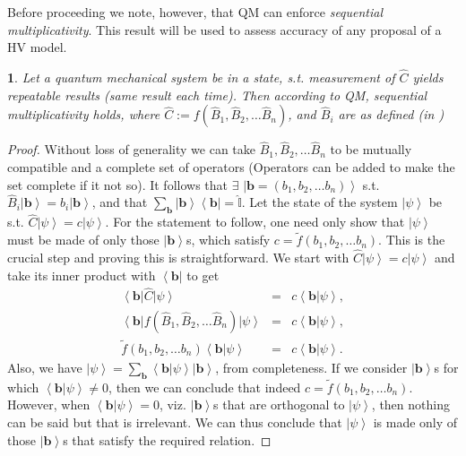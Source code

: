 \documentclass[british,aps,prl,superscriptaddress,nofootinbib,times,reprint]{revtex4-1}
\theoremstyle{plain}
\theoremstyle{definition}
\theoremstyle{remark}
\theoremstyle{remark}
\theoremstyle{remark}
\theoremstyle{plain}
\newtheorem*{prop*}{\protect\propositionname}
\theoremstyle{plain}
\theoremstyle{plain}
\theoremstyle{definition}
\theoremstyle{definition}
\providecommand{\propositionname}{Proposition}
\begin{document}
Before proceeding we note, however, that QM can
enforce \emph{sequential multiplicativity}. This
result will be used to assess accuracy of any
proposal of a HV
model.
\begin{prop*} 
Let a quantum mechanical 
system be in a state, s.t. measurement of
$\hat{C}$ yields repeatable results (same result
each time). Then according to QM, \emph{sequential
multiplicativity} holds, where $\hat{C}:=
f(\hat{B}_{1},\hat{B}_{2},\dots\hat{B}_{n})$, and
$\hat{B}_{i}$ are as defined (in )
\end{prop*}
\begin{proof} 
Without loss of generality we can take
$\hat{B}_{1},\hat{B}_{2},\dots\hat{B}_{n}$ to be
mutually compatible and a complete set of
operators (Operators can be added to make the set
complete if it not so).
It follows
that $\exists$
$\left|\mathbf{b}=\left(b_{1},b_{2},\dots
b_{n}\right)\right\rangle $ s.t.
$\hat{B}_{i}\left|\mathbf{b}\right\rangle
=b_{i}\left|\mathbf{b}\right\rangle $,
and that
$\sum_{\mathbf{b}}\left|\mathbf{b}\right\rangle
\left\langle \mathbf{b}\right|=\hat{\mathbb{I}}$.
Let the state of the system
$\left|\psi\right\rangle $ be s.t.
$\hat{C}\left|\psi\right\rangle
=c\left|\psi\right\rangle $. For
the statement to follow, one need only show that
$\left|\psi\right\rangle $ must be made of only
those $\left|\mathbf{b}\right\rangle $s, which
satisfy $c=\tilde
f(b_{1},b_{2},\dots
b_{n})$.  This is the crucial step and
proving this is straightforward. We start with
$\hat{C}\left|\psi\right\rangle
=c\left|\psi\right\rangle $ and take its inner
product with $\left\langle \mathbf{b}\right|$ to
get \begin{eqnarray*} \left\langle
\mathbf{b}\right|\hat{C}\left|\psi\right\rangle  &
= & c\left\langle \mathbf{b}|\psi\right\rangle ,\\
\left\langle
\mathbf{b}\right|f(\hat{B}_{1},\hat{B}_{2},\dots\hat{B}_{n})
\left|\psi\right\rangle
& = & c\left\langle \mathbf{b}|\psi\right\rangle
,\\ \tilde f(b_{1},b_{2},\dots
b_{n})\left\langle
\mathbf{b}|\psi\right\rangle  & = & c\left\langle
\mathbf{b}|\psi\right\rangle .  \end{eqnarray*}
Also, we have $\left|\psi\right\rangle
=\sum_{\mathbf{b}}\left\langle
\mathbf{b}|\psi\right\rangle
\left|\mathbf{b}\right\rangle $, from
completeness. If we consider
$\left|\mathbf{b}\right\rangle $s for which
$\left\langle \mathbf{b}|\psi\right\rangle \neq0$,
then we can conclude that indeed $c=\tilde
f(b_{1},b_{2},\dots
b_{n})$. However, when $\left\langle
\mathbf{b}|\psi\right\rangle =0$, viz.
$\left|\mathbf{b}\right\rangle $s that are
orthogonal to $\left|\psi\right\rangle $, then
nothing can be said but that is irrelevant. We can thus conclude that
$\left|\psi\right\rangle $ is made only of those
$\left|\mathbf{b}\right\rangle $s that satisfy the
required relation.
\end{proof} 
\end{document}
